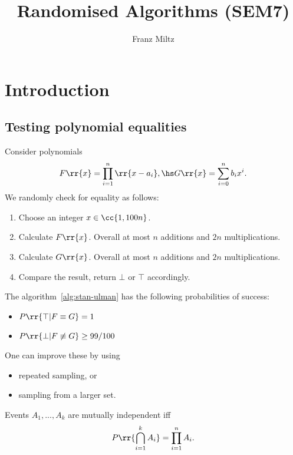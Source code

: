 \documentclass{article}
\title{Randomised Algorithms (SEM7)}
\author{Franz Miltz}
\begin{document}
\maketitle


\section{Introduction}

\subsection{Testing polynomial equalities}

\begin{algorithm}
  \label{alg:stan-ulam}
  Consider polynomials
  \begin{align*}
    F \rr{ x } = \prod_{i=1}^n \rr{ x - a_i }, \hs G \rr{ x } = \sum_{ i=0 }^{ n } b_i x^i.
  \end{align*}
  We randomly check for equality as follows:
  \begin{enumerate}
    \item Choose an integer $x\in \cc{ 1, 100n }$.
    \item Calculate $F \rr{ x }$. Overall at most $n$ additions and $2n$ multiplications.
    \item Calculate $G \rr{ x }$. Overall at most $n$ additions and $2n$ multiplications.
    \item Compare the result, return $\bot$ or $\top$ accordingly.
  \end{enumerate}
\end{algorithm}


\begin{theorem}
  \label{thm:stan-ulman-probabilities}
  The algorithm~\ref{alg:stan-ulman} has the following probabilities of success:
  \begin{itemize}
    \item $P \rr{ \top | F\equiv G } = 1$
    \item $P \rr{ \bot | F\not\equiv G } \geq 99/100$
  \end{itemize}
  One can improve these by using
  \begin{itemize}
    \item repeated sampling, or
    \item sampling from a larger set.
  \end{itemize}
\end{theorem}


\begin{definition}
  \label{def:independence}
  Events $A_1,...,A_k$ are mutually independent iff
  \begin{align*}
    P \rr{ \bigcap_{i=1}^k A_i } = \prod_{i=1}^n A_i.
  \end{align*}
\end{definition}
\end{document}
